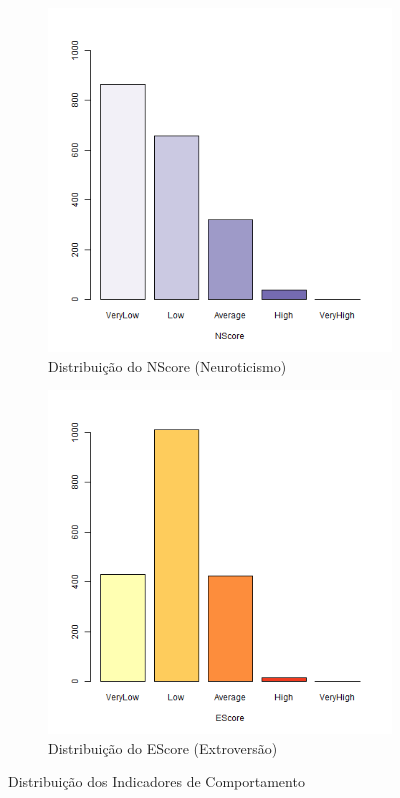 \documentclass[
	article,			%
	11pt,				%
	oneside,			%
	a4paper,			%
	english,			%
	brazil,				%
	sumario=tradicional
	]{abntex2}
\begin{document}
\begin{figure}[H]
\centering
\begin{subfigure}{.5\textwidth}
  \centering
  \includegraphics[width=\linewidth]{figuras/dist_nscore.png}
  \caption{Distribuição do NScore (Neuroticismo)}
  \label{nscore}
\end{subfigure}%
\begin{subfigure}{.5\textwidth}
  \centering
  \includegraphics[width=\linewidth]{figuras/dist_escore.png}
  \caption{Distribuição do EScore (Extroversão)}
  \label{escore}
\end{subfigure}
\caption{Distribuição dos Indicadores de Comportamento}
\label{comp1}
\end{figure}
\end{document}
